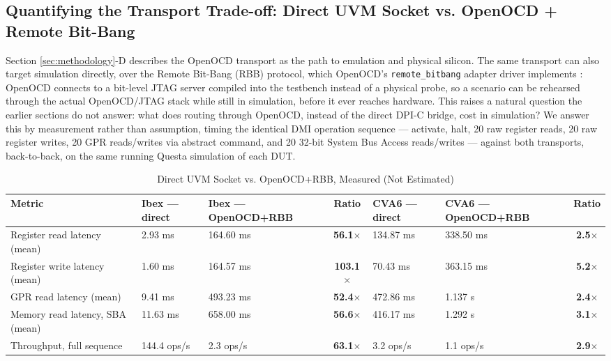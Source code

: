 \documentclass[conference]{IEEEtran}
\begin{document}
\subsection{Quantifying the Transport Trade-off: Direct UVM Socket vs. OpenOCD + Remote Bit-Bang}
\label{sec:rbb}

Section \ref{sec:methodology}-D describes the OpenOCD transport as the path to emulation and physical silicon. The same transport can also target simulation directly, over the Remote Bit-Bang (RBB) protocol, which OpenOCD's \texttt{remote\_bitbang} adapter driver implements \cite{openocd-guide}: OpenOCD connects to a bit-level JTAG server compiled into the testbench instead of a physical probe, so a scenario can be rehearsed through the actual OpenOCD/JTAG stack while still in simulation, before it ever reaches hardware. This raises a natural question the earlier sections do not answer: what does routing through OpenOCD, instead of the direct DPI-C bridge, cost in simulation? We answer this by measurement rather than assumption, timing the identical DMI operation sequence --- activate, halt, 20 raw register reads, 20 raw register writes, 20 GPR reads/writes via abstract command, and 20 32-bit System Bus Access reads/writes --- against both transports, back-to-back, on the same running Questa simulation of each DUT.

\begin{table}[htbp]
\caption{Direct UVM Socket vs. OpenOCD+RBB, Measured (Not Estimated)}
\label{tab:rbb}
\centering
\begin{tabularx}{\textwidth}{@{}lXXcXXc@{}}
\toprule
\textbf{Metric} & \textbf{Ibex --- direct} & \textbf{Ibex --- OpenOCD+RBB} & \textbf{Ratio} & \textbf{CVA6 --- direct} & \textbf{CVA6 --- OpenOCD+RBB} & \textbf{Ratio} \\
\midrule
Register read latency (mean) & 2.93 ms & 164.60 ms & \textbf{56.1$\times$} & 134.87 ms & 338.50 ms & \textbf{2.5$\times$} \\
Register write latency (mean) & 1.60 ms & 164.57 ms & \textbf{103.1$\times$} & 70.43 ms & 363.15 ms & \textbf{5.2$\times$} \\
GPR read latency (mean) & 9.41 ms & 493.23 ms & \textbf{52.4$\times$} & 472.86 ms & 1.137 s & \textbf{2.4$\times$} \\
Memory read latency, SBA (mean) & 11.63 ms & 658.00 ms & \textbf{56.6$\times$} & 416.17 ms & 1.292 s & \textbf{3.1$\times$} \\
Throughput, full sequence & 144.4 ops/s & 2.3 ops/s & \textbf{63.1$\times$} & 3.2 ops/s & 1.1 ops/s & \textbf{2.9$\times$} \\
\bottomrule
\end{tabularx}
\end{table}
\end{document}

